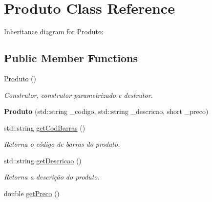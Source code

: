 \hypertarget{classProduto}{}\section{Produto Class Reference}
\label{classProduto}


Inheritance diagram for Produto\+:
\subsection*{Public Member Functions}
\begin{DoxyCompactItemize}
\item 
\hyperlink{classProduto_adcd5834a1f04cc42fef88bf60217b8f4}{Produto} ()\hypertarget{classProduto_adcd5834a1f04cc42fef88bf60217b8f4}{}\label{classProduto_adcd5834a1f04cc42fef88bf60217b8f4}

\begin{DoxyCompactList}\small\item\em Construtor, construtor parametrizado e destrutor. \end{DoxyCompactList}\item 
{\bfseries Produto} (std\+::string \+\_\+codigo, std\+::string \+\_\+descricao, short \+\_\+preco)\hypertarget{classProduto_ad4ebbe5a8a8ddb64904f122fa9f201c5}{}\label{classProduto_ad4ebbe5a8a8ddb64904f122fa9f201c5}

\item 
std\+::string \hyperlink{classProduto_aa8e9057d5f0ac3d145333223cb513b3e}{get\+Cod\+Barras} ()\hypertarget{classProduto_aa8e9057d5f0ac3d145333223cb513b3e}{}\label{classProduto_aa8e9057d5f0ac3d145333223cb513b3e}

\begin{DoxyCompactList}\small\item\em Retorna o código de barras do produto. \end{DoxyCompactList}\item 
std\+::string \hyperlink{classProduto_ada2c72e139e09afa967aa06a4290d5f8}{get\+Descricao} ()\hypertarget{classProduto_ada2c72e139e09afa967aa06a4290d5f8}{}\label{classProduto_ada2c72e139e09afa967aa06a4290d5f8}

\begin{DoxyCompactList}\small\item\em Retorna a descrição do produto. \end{DoxyCompactList}\item 
double \hyperlink{classProduto_a53548783d7fad3ea6d5e000fa2227dcf}{get\+Preco} ()\hypertarget{classProduto_a53548783d7fad3ea6d5e000fa2227dcf}{}\label{classProduto_a53548783d7fad3ea6d5e000fa2227dcf}


\end{DoxyCompactItemize}

